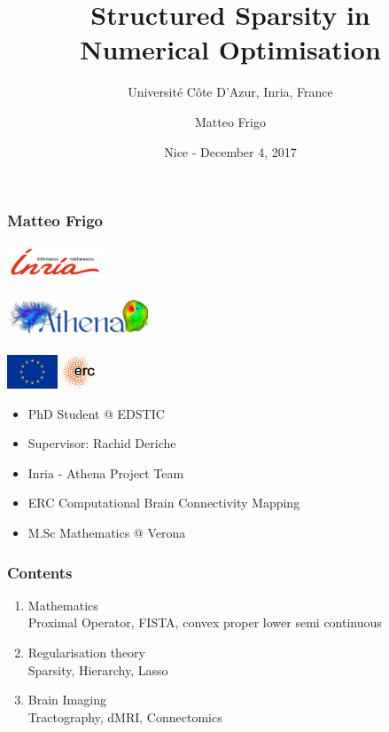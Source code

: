 \documentclass[aspectratio=169]{beamer}
\title{Structured Sparsity in\\Numerical Optimisation}
\subtitle{Universit\'{e} C\^ote D'Azur, Inria, France}
\author{Matteo Frigo}
\date{Nice - December 4, 2017}
\begin{document}
	\frame{\titlepage}
	
	\begin{frame}
	\frametitle{Matteo Frigo}
	\begin{minipage}{.45\textwidth}
	\begin{center}
	\includegraphics[height=1cm,keepaspectratio]{img/logo_inria}\\ \quad \\
	\includegraphics[height=1cm,keepaspectratio]{img/athena-logo}\\ \quad \\
	\includegraphics[height=1cm,keepaspectratio]{img/flag_yellow_high}\qquad
	\includegraphics[height=1cm,keepaspectratio]{img/erc_logo}
	\end{center}
	\end{minipage}
	\quad
	\begin{minipage}{.45\textwidth}
	\begin{itemize}
	\item PhD Student @ EDSTIC
	\item Supervisor: Rachid Deriche
	\item Inria - Athena Project Team
	\item ERC Computational Brain Connectivity Mapping 
	\item M.Sc Mathematics @ Verona
	\end{itemize}
	\end{minipage}
	\end{frame}
	
	\begin{frame}
		\frametitle{Contents}
		\begin{enumerate}
			\item Mathematics \\ \textcolor{ExecusharesGrey}{\footnotesize\hspace{1em} Proximal Operator, FISTA, convex proper lower semi continuous}
			\item Regularisation theory  \\ \textcolor{ExecusharesGrey}{\footnotesize\hspace{1em} Sparsity, Hierarchy, Lasso}
			\item Brain Imaging \\ \textcolor{ExecusharesGrey}{\footnotesize\hspace{1em} Tractography, dMRI, Connectomics}
		\end{enumerate}
	\end{frame}
	
\end{document}
